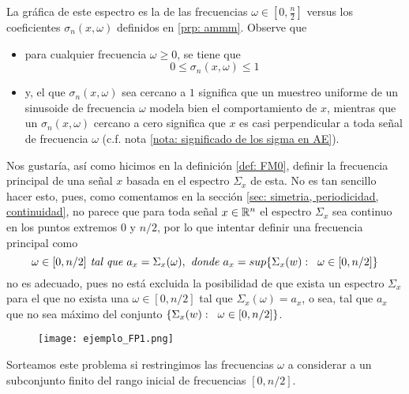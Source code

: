 \begin{itemize}
	La gráfica de este espectro es la de 
	las frecuencias $\omega \in [0, \frac{n}{2}]$ versus	
	los coeficientes
	$\sigma_{n}(x, \omega)$ definidos en 
	\ref{prp: ammm}. Observe que
	\begin{itemize}
		\item para cualquier frecuencia $\omega \geq 0$, se tiene que
		\[
		0 \leq \sigma_{n}(x, \omega) \leq 1
		\]
		\item 
	y, el que
	$\sigma_{n}(x, \omega)$ sea cercano a $1$ significa que un
	muestreo uniforme de un sinusoide de frecuencia $\omega$
	modela bien el comportamiento de $x$,
	mientras que un $\sigma_{n}(x, \omega)$ cercano
	a cero significa que 
	$x$ es casi perpendicular a toda señal de frecuencia $\omega$
	(c.f. nota \ref{nota: significado de los sigma en AE}).
	\end{itemize}
\end{itemize}

Nos gustaría, así como hicimos en la definición
\ref{def: FM0}, definir la frecuencia principal 
de una señal $x$ basada en el espectro
$\Sigma_{x}$ de esta. No es tan sencillo hacer esto, pues,
como comentamos en la sección
\ref{sec: simetria, periodicidad, continuidad}, no parece
que para toda señal $x \in \mathbb{R}^{n}$ el espectro
$\Sigma_{x}$ sea continuo en los puntos extremos
$0$ y $n/2$, por lo que intentar definir una
frecuencia principal como
\[
\omega \in [0, n/2] \textit{ tal que }
a_{x} = \Sigma_{x}(\omega), \textit{ donde }
a_{x} = sup \{ \Sigma_{x}(w): \hspace{0.2cm} \omega
\in [0, n/2] \}
\]
no es adecuado, pues no está excluida la 
posibilidad de que exista un espectro $\Sigma_{x}$
para el que no exista una $\omega \in [0, n/2]$ 
tal que $\Sigma_{x}(\omega) = a_{x}$, o sea, tal que 
$a_{x}$ que no sea máximo
del conjunto 
$\{ \Sigma_{x}(w): \hspace{0.2cm} \omega
\in [0, n/2] \}$. \\

\begin{figure}[H]
	\centering
	\texttt{[image: ejemplo\_FP1.png]} 
\end{figure}	
Sorteamos este problema si restringimos las frecuencias
$\omega$ a considerar a un subconjunto finito del
rango inicial de frecuencias
$[0, n/2]$.

